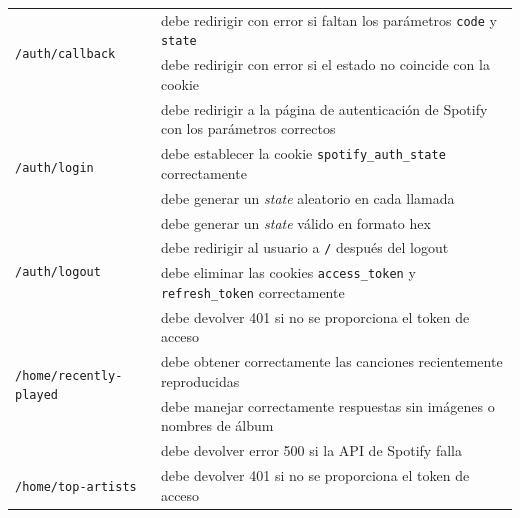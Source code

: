 \begin{longtable}{|p{5cm}|p{9cm}|}
  \multirow{2}{*}{\texttt{/auth/callback}}              & debe redirigir con error si faltan los parámetros \texttt{code} y \texttt{state}         \\ \cline{2-2}
                                                        & debe redirigir con error si el estado no coincide con la cookie                          \\ \hline
  \multirow{4}{*}{\texttt{/auth/login}}                 & debe redirigir a la página de autenticación de Spotify con los parámetros correctos      \\ \cline{2-2}
                                                        & debe establecer la cookie \texttt{spotify\_auth\_state} correctamente                    \\ \cline{2-2}
                                                        & debe generar un \textit{state} aleatorio en cada llamada                                 \\ \cline{2-2}
                                                        & debe generar un \textit{state} válido en formato hex                                     \\ \hline
  \multirow{2}{*}{\texttt{/auth/logout}}                & debe redirigir al usuario a \texttt{/} después del logout                                \\ \cline{2-2}
                                                        & debe eliminar las cookies \texttt{access\_token} y \texttt{refresh\_token} correctamente \\ \hline
  \multirow{4}{*}{\texttt{/home/recently-played}}       & debe devolver 401 si no se proporciona el token de acceso                                \\ \cline{2-2}
                                                        & debe obtener correctamente las canciones recientemente reproducidas                      \\ \cline{2-2}
                                                        & debe manejar correctamente respuestas sin imágenes o nombres de álbum                    \\ \cline{2-2}
                                                        & debe devolver error 500 si la API de Spotify falla                                       \\ \hline
  \multirow{5}{*}{\texttt{/home/top-artists}}           & debe devolver 401 si no se proporciona el token de acceso                                \\ \cline{2-2}

\end{longtable}
